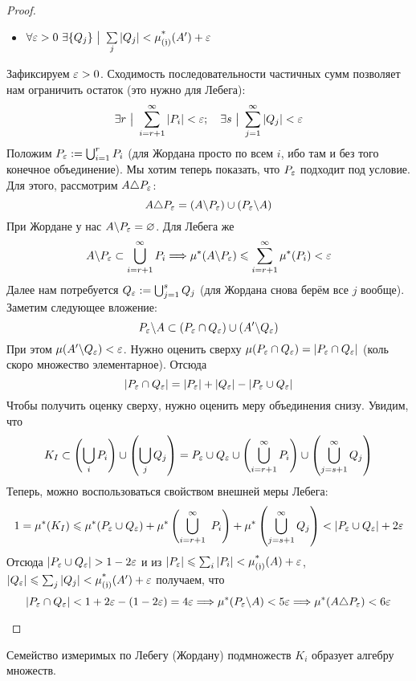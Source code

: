 \begin{proof}
\begin{itemize}
\begin{itemize}
			\item \(\forall \varepsilon > 0\ \exists \{Q_j\} \ \big|\  \sum\limits_j |Q_j| < \operatorname{\mu^*_{(\mathfrak{j})}}(A') + \varepsilon\)
		\end{itemize}
		Зафиксируем $\varepsilon > 0$. Сходимость последовательности частичных сумм позволяет нам ограничить остаток (это нужно для Лебега):
		\[
			\exists r \ \big|\  \sum\limits_{i = r + 1}^\infty |P_i| < \varepsilon; \quad \exists s \ \big|\  \sum\limits_{j = 1}^\infty |Q_j| < \varepsilon
		\]
		Положим $P_\varepsilon := \bigcup_{i = 1}^r P_i$ (для Жордана просто по всем $i$, ибо там и без того конечное объединение). Мы хотим теперь показать, что $P_\varepsilon$ подходит под условие. Для этого, рассмотрим $A \triangle P_\varepsilon$:
		\[
			A \triangle P_\varepsilon = (A \backslash P_\varepsilon) \cup (P_\varepsilon \backslash A)
		\]
		При Жордане у нас $A \backslash P_\varepsilon = \varnothing$. Для Лебега же
		\[
			A \backslash P_\varepsilon \subset \bigcup_{i = r + 1}^\infty P_i \Longrightarrow \mu^*(A \backslash P_\varepsilon) \leqslant \sum\limits_{i = r + 1}^\infty \mu^*(P_i) < \varepsilon
		\]
		Далее нам потребуется $Q_\varepsilon := \bigcup_{j = 1}^s Q_j$ (для Жордана снова берём все $j$ вообще). Заметим следующее вложение:
		\[
			P_\varepsilon \backslash A \subset (P_\varepsilon \cap Q_\varepsilon) \cup (A' \backslash Q_\varepsilon)
		\]
		При этом $\mu(A' \backslash Q_\varepsilon) < \varepsilon$. Нужно оценить сверху $\mu(P_\varepsilon \cap Q_\varepsilon) = |P_\varepsilon \cap Q_\varepsilon|$ (коль скоро множество элементарное). Отсюда
		\[
			|P_\varepsilon \cap Q_\varepsilon| = |P_\varepsilon| + |Q_\varepsilon| - |P_\varepsilon \cup Q_\varepsilon|
		\]
		Чтобы получить оценку сверху, нужно оценить меру объединения снизу. Увидим, что
		\[
			K_I \subset \left(\bigcup_i P_i\right) \cup \left(\bigcup_j Q_j\right) = P_\varepsilon \cup Q_\varepsilon \cup \left(\bigcup_{i = r + 1}^\infty P_i\right) \cup \left(\bigcup_{j = s + 1}^\infty Q_j\right)
		\]
		Теперь, можно воспользоваться свойством внешней меры Лебега:
		\[
			1 = \mu^*(K_I) \leqslant \mu^*(P_\varepsilon \cup Q_\varepsilon) + \mu^*\left(\bigcup_{i = r + 1}^\infty\ P_i\right) + \mu^*\left(\bigcup_{j = s + 1}^\infty Q_j\right) < |P_\varepsilon \cup Q_\varepsilon| + 2\varepsilon
		\]
		Отсюда $|P_\varepsilon \cup Q_\varepsilon| > 1 - 2\varepsilon$ и из $|P_\varepsilon| \leqslant \sum_i |P_i| < \operatorname{\mu^*_{(\mathfrak{j})}}(A) + \varepsilon$, $|Q_\varepsilon| \leqslant \sum_j |Q_j| < \operatorname{\mu^*_{(\mathfrak{j})}}(A') + \varepsilon$ получаем, что
		\[
			|P_\varepsilon \cap Q_\varepsilon| < 1 + 2\varepsilon - (1 - 2\varepsilon) = 4\varepsilon \Longrightarrow \mu^*(P_\varepsilon \backslash A) < 5\varepsilon \Longrightarrow \mu^*(A \triangle P_\varepsilon) < 6\varepsilon
		\]
	\end{itemize}
\end{proof}

\begin{theorem}
	Семейство измеримых по Лебегу (Жордану) подмножеств $K_i$ образует алгебру множеств.
\end{theorem}

